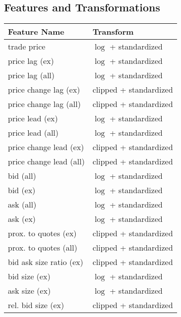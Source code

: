 \subsection{Features and Transformations}
\label{app:feature-and-transformations}

\begin{table}[H]
    \centering
    \begin{threeparttable}
        \begin{tabular}{@{}ll@{}}
            \toprule
            Feature Name            & Transform              \\ \midrule
            trade price             & $\log$ + standardized  \\
            price lag (ex)          & $\log$ + standardized  \\
            price lag (all)         & $\log$ + standardized  \\
            price change lag (ex)   & clipped + standardized \\
            price change lag (all)  & clipped + standardized \\
            price lead (ex)         & $\log$ + standardized  \\
            price lead (all)        & $\log$ + standardized  \\
            price change lead (ex)  & clipped + standardized \\
            price change lead (all) & clipped + standardized \\
            bid (all)               & $\log$ + standardized  \\
            bid (ex)                & $\log$ + standardized  \\
            ask (all)               & $\log$ + standardized  \\
            ask (ex)                & $\log$ + standardized  \\
            prox. to quotes (ex)    & clipped + standardized \\
            prox. to quotes (all)   & clipped + standardized \\
            bid ask size ratio (ex) & clipped + standardized \\
            bid size (ex)           & $\log$ + standardized  \\
            ask size (ex)           & $\log$ + standardized  \\
            rel. bid size (ex)      & clipped + standardized \\

\end{tabular}
\end{threeparttable}
\end{table}
